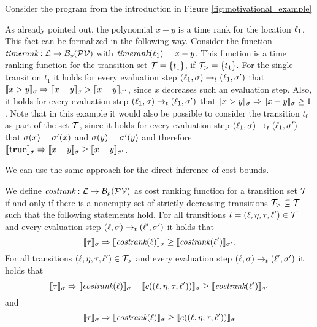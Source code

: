 \begin{example}
  Consider the program from the introduction in Figure \ref{fig:motivational_example}
  
  As already pointed out, the polynomial $x-y$ is a time rank for the location $\ell_1$.
  This fact can be formalized in the following way.
  Consider the function $\emph{timerank}: \mathcal{L} \rightarrow \mathcal{B}_p(\mathcal{PV})$ with $\emph{timerank}(\ell_1) = x-y$.
  This function is a time ranking function for the transition set $\mathcal{T} = \lbrace t_1 \rbrace$, if $\mathcal{T}_> = \lbrace t_1 \rbrace$.
  For the single transition $t_1$ it holds for every evaluation step $(\ell_1,\sigma) \rightarrow_t (\ell_1,\sigma')$ that $\llbracket x>y \rrbracket_{\sigma} \Rightarrow \llbracket x-y \rrbracket_{\sigma} > \llbracket x-y \rrbracket_{\sigma'}$, since $x$ decreases such an evaluation step.
  Also, it holds for every evaluation step $(\ell_1,\sigma) \rightarrow_t (\ell_1,\sigma')$ that $\llbracket x>y \rrbracket_{\sigma} \Rightarrow \llbracket x-y \rrbracket_{\sigma} \geq 1$.
  Note that in this example it would also be possible to consider the transition $t_0$ as part of the set $\mathcal{T}$, since it holds for every evaluation step $(\ell_1,\sigma) \rightarrow_t (\ell_1,\sigma')$ that $\sigma(x)=\sigma'(x)$ and $\sigma(y)=\sigma'(y)$ and therefore $\llbracket \textbf{true} \rrbracket_{\sigma} \Rightarrow \llbracket x-y \rrbracket_{\sigma} \geq \llbracket x-y \rrbracket_{\sigma'}$.
\end{example}

We can use the same approach for the direct inference of cost bounds.

\begin{definition} 
  We define $\emph{costrank}: \mathcal{L} \rightarrow \mathcal{B}_p(\mathcal{PV})$ as cost ranking function for a transition set $\mathcal{T}$ if and only if there is a nonempty set of strictly decreasing transitions $\mathcal{T}_{>} \subseteq \mathcal{T}$ such that the following statements hold.
  For all transitions $t = (\ell, \eta, \tau, \ell') \in \mathcal{T}$ and every evaluation step $(\ell, \sigma) \rightarrow_t (\ell', \sigma')$ it holds that
  \[ \llbracket \tau \rrbracket_{\sigma} \Rightarrow \llbracket \emph{costrank}(\ell) \rrbracket_{\sigma} \geq \llbracket \emph{costrank}(\ell') \rrbracket_{\sigma'}. \]
  For all transitions $(\ell, \eta, \tau, \ell') \in \mathcal{T}_{>}$ and every evaluation step $(\ell, \sigma) \rightarrow_t (\ell', \sigma')$ it holds that        
  \[ \llbracket \tau \rrbracket_{\sigma} \Rightarrow \llbracket \emph{costrank}(\ell) \rrbracket_{\sigma} - \llbracket c((\ell, \eta, \tau, \ell')) \rrbracket_{\sigma} \geq \llbracket \emph{costrank}(\ell') \rrbracket_{\sigma'} \]
  and
  \[ \llbracket \tau \rrbracket_{\sigma} \Rightarrow \llbracket \emph{costrank}(\ell) \rrbracket_{\sigma} \geq \llbracket c((\ell, \eta, \tau, \ell')) \rrbracket_{\sigma} \]
\end{definition}


